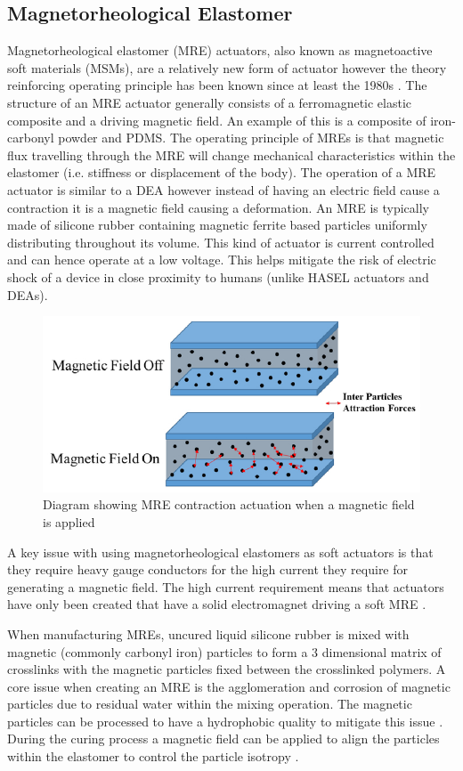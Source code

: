 \subsection{Magnetorheological Elastomer}
Magnetorheological elastomer (MRE) actuators, also known as magnetoactive soft materials (MSMs), are a relatively new form of actuator however the theory reinforcing operating principle has been known since at least the 1980s \citep{Jolly1996}. The structure of an MRE actuator generally consists of a ferromagnetic elastic composite and a driving magnetic field. An example of this is a composite of iron-carbonyl powder and PDMS. The operating principle of MREs is that magnetic flux travelling through the MRE will change mechanical characteristics within the elastomer (i.e. stiffness or displacement of the body). The operation of a MRE actuator is similar to a DEA however instead of having an electric field cause a contraction it is a magnetic field causing a deformation. An MRE is typically made of silicone rubber containing magnetic ferrite based particles uniformly distributing throughout its volume. This kind of actuator is current controlled and can hence operate at a low voltage. This helps mitigate the risk of electric shock of a device in close proximity to humans (unlike HASEL actuators and DEAs).
\begin{figure}[H]
  \centering
  \includegraphics[width=0.6\linewidth]{Figures/MRE_actuate.jpg} %
  \caption{Diagram showing MRE contraction actuation when a magnetic field is applied \citep{Park2018a}}
  \label{fig:Artificial Muscle_MRE}
\end{figure}
A key issue with using magnetorheological elastomers as soft actuators is that they require heavy gauge conductors for the high current they require for generating a magnetic field. The high current requirement means that actuators have only been created that have a solid electromagnet driving a soft MRE \citep{Bose2012}. 

When manufacturing MREs, uncured liquid silicone rubber is mixed with magnetic (commonly carbonyl iron) particles to form a 3 dimensional matrix of crosslinks with the magnetic particles fixed between the crosslinked polymers. A core issue when creating an MRE is the agglomeration and corrosion of magnetic particles due to residual water within the mixing operation. The magnetic particles can be processed to have a hydrophobic quality to mitigate this issue \cite{Burhannuddin2020,Ge2020}. During the curing process a magnetic field can be applied to align the particles within the elastomer to control the particle isotropy \cite{Ge2020,LaleganiDezaki2023}.

